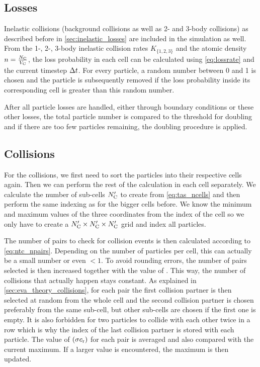 \subsection{Losses}
Inelastic collisions (background collisions as well as 2- and 3-body collisions) as described before in \cref{sec:inelastic_losses} are included in the simulation as well. From the 1-, 2-, 3-body inelastic collision rates $K_{\{1,2,3\}}$ and the atomic density $n = \frac{N_\text{C}}{V_\text{C}}$, the loss probability in each cell can be calculated using \cref{eq:lossrate} and the current timestep $\Delta t$.
For every particle, a random number between 0 and 1 is chosen and the particle is subsequently removed if the loss probability inside its corresponding cell is greater than this random number.

After all particle losses are handled, either through boundary conditions or these other losses, the total particle number is compared to the threshold for doubling and if there are too few particles remaining, the doubling procedure is applied.

\subsection{Collisions}
For the collisions, we first need to sort the particles into their respective cells again. Then we can perform the rest of the calculation in each cell separately.
We calculate the number of sub-cells $N'_\text{C}$ to create from \cref{eq:tas_ncells} and then perform the same indexing as for the bigger cells before. We know the minimum and maximum values of the three coordinates from the index of the cell so we only have to create a $N'_\text{C} \times N'_\text{C} \times N'_\text{C}$ grid and index all particles.

The number of pairs to check for collision events is then calculated according to \cref{eq:ntc_npairs}. Depending on the number of particles per cell, this can actually be a small number or even $< 1$. To avoid rounding errors, the number of pairs selected is then increased together with the value of \maxProb. This way, the number of collisions that actually happen stays constant. As explained in \cref{sec:eva_theory_collisions}, for each pair the first collision partner is then selected at random from the whole cell and the second collision partner is chosen preferably from the same sub-cell, but other sub-cells are chosen if the first one is empty. It is also forbidden for two particles to collide with each other twice in a row which is why the index of the last collision partner is stored with each particle. The value of $(\sigma c_\text{r})$ for each pair is averaged and also compared with the current maximum. If a larger value is encountered, the maximum is then updated.

